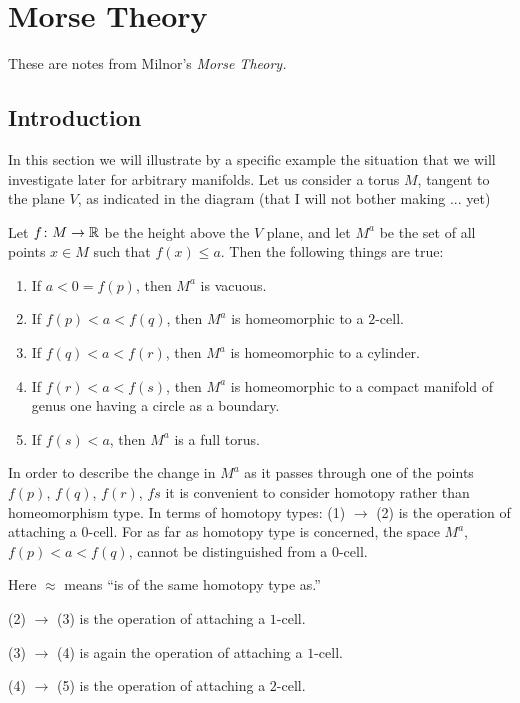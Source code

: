 \chapter{Morse Theory}
These are notes from Milnor's \emph{Morse Theory.}

\section{Introduction}
In this section we will illustrate by a specific example the situation that
we will investigate later for arbitrary manifolds. Let us consider a torus
\(M\), tangent to the plane \(V\), as indicated in the diagram (that I will
not bother making ... yet)

Let \(f\colon M\to\mathbb{R}\) be the height above the \(V\) plane, and let
\(M^a\) be the set of all points \(x\in M\) such that \(f(x)\leq a\). Then
the following things are true:
\begin{enumerate}[label=(\arabic*),noitemsep]
\item If \(a<0=f(p)\), then \(M^a\) is vacuous.
\item If \(f(p)<a<f(q)\), then \(M^a\) is homeomorphic to a \(2\)-cell.
\item If \(f(q)<a<f(r)\), then \(M^a\) is homeomorphic to a cylinder.
\item If \(f(r)<a<f(s)\), then \(M^a\) is homeomorphic to a compact
  manifold of genus one having a circle as a boundary.
\item If \(f(s)<a\), then \(M^a\) is a full torus.
\end{enumerate}

In order to describe the change in \(M^a\) as it passes through one of the
points \(f(p)\), \(f(q)\), \(f(r)\), \(fs\) it is convenient to consider
homotopy rather than homeomorphism type. In terms of homotopy types: (1)
\(\to\) (2) is the operation of attaching a \(0\)-cell. For as far as
homotopy type is concerned, the space \(M^a\), \(f(p)<a<f(q)\), cannot be
distinguished from a \(0\)-cell.

Here \(\approx\) means ``is of the same homotopy type as.''

(2) \(\to\) (3) is the operation of attaching a \(1\)-cell.

(3) \(\to\) (4) is again the operation of attaching a \(1\)-cell.

(4) \(\to\) (5) is the operation of attaching a \(2\)-cell.

